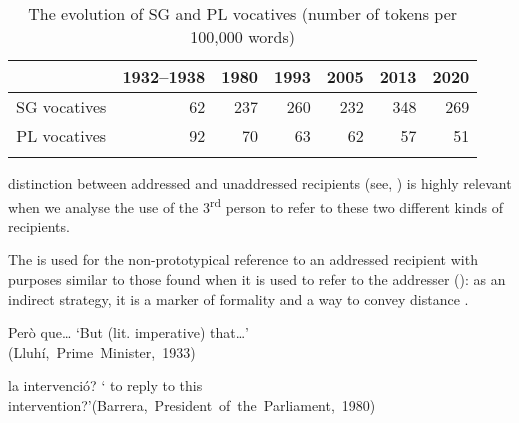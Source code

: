 \documentclass[output=paper]{langscibook}
\begin{document}
\begin{table}
\begin{tabular}{ccccccc} 
\lsptoprule
& {1932–1938} & {1980} & {1993} & {2005} & {2013} & {{2020}}\\
\midrule

{SG vocatives} & \multicolumn{1}{r}{62} & \multicolumn{1}{r}{237} & \multicolumn{1}{r}{260} & \multicolumn{1}{r}{232} & \multicolumn{1}{r}{348} & \multicolumn{1}{r}{269}\\
{PL vocatives} & \multicolumn{1}{r}{92} & \multicolumn{1}{r}{70} & \multicolumn{1}{r}{63} & \multicolumn{1}{r}{62} & \multicolumn{1}{r}{57} & \multicolumn{1}{r}{51}\\
\lspbottomrule
\end{tabular}
\caption{The evolution of SG and PL vocatives (number of tokens per 100,000 words)}
\label{tab:nogue:12}
\end{table}


\label{sec:nogue:2.2.1.7}





 distinction between addressed and unaddressed recipients (see, ) is highly relevant when we analyse the use of the 3\textsuperscript{rd} person to refer to these two different kinds of recipients.



The  is used for the non-prototypical reference to an addressed recipient with purposes similar to those found when it is used to refer to the addresser (): as an indirect strategy, it is a marker of formality and a way to convey distance .


\ea\label{ex:nogue:29}
 \ea\label{ex:nogue:29a}
{{Però}  {que…}}
\glt `But     (lit. imperative) that…'\\\hfill\hbox{(Lluhí, Prime Minister, 1933)}

\ex\label{ex:nogue:29b}
{ {la intervenció?}}
\glt `        to reply to this intervention?'\hfill\hbox{(Barrera, President of the Parliament, 1980)}
\z 
\z 
\end{document}
